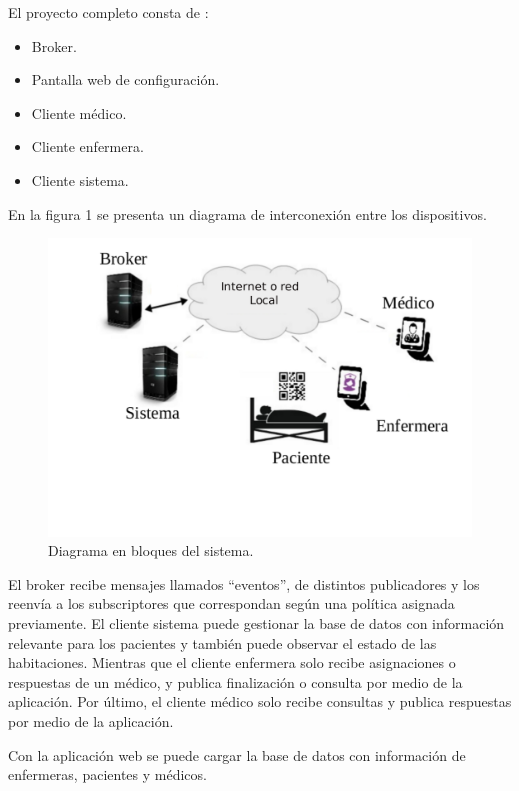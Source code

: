 \documentclass[
11pt, %
]{charter}
\begin{document}
\vspace{50px}

El proyecto completo consta de :
\begin{itemize}
\item Broker.
\item Pantalla web de configuración.
\item Cliente médico.
\item Cliente enfermera.
\item Cliente sistema.
\end{itemize}
En la figura 1 se presenta un diagrama de interconexión entre los dispositivos.



\begin{figure}[htpb]
\centering 
\includegraphics[width=.7\textwidth]{./Figuras/diag3.pdf}
\caption{ Diagrama en bloques del sistema.}
\label{fig:diagBloques}
\end{figure}


El broker recibe mensajes llamados ``eventos'', de distintos publicadores y los reenvía a los subscriptores que correspondan según una política asignada previamente. El cliente sistema puede gestionar la base de datos con información relevante para los pacientes y también puede observar el estado de las habitaciones. Mientras que el cliente enfermera solo recibe asignaciones o respuestas de un médico, y publica finalización o consulta por medio de la aplicación. Por último, el cliente médico solo recibe consultas y publica respuestas por medio de la aplicación.

Con la aplicación web se puede cargar la base de datos con información de enfermeras, pacientes y médicos.
\vfill

 
\end{document}
